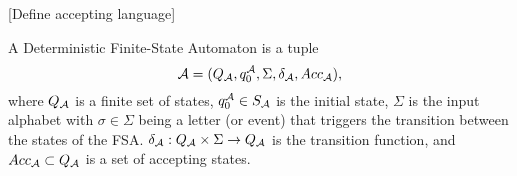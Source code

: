 \documentclass{ifacconf}
\newcommand{\red}[1]{{\color{red} #1}}
\begin{document}
% 

\red{[Define accepting language]}
\begin{definition}
A Deterministic Finite-State Automaton is a tuple
 \[\mathcal{A} = (Q_{\mathcal{A}}, q_0^{\mathcal{A}}, \Sigma, \delta_{\mathcal{A}}, Acc_{\mathcal{A}}),\] where %
$Q_{\mathcal{A}}$ is a finite set of states, $q_0^{\mathcal{A}} \in S_{\mathcal{A}}$ is the initial state,
$\Sigma$ is the input alphabet with $\sigma\in\Sigma$ being a letter (or event) that triggers the transition between the states of the FSA.   
$\delta_{\mathcal{A}} : Q_{\mathcal{A}} \times \Sigma \rightarrow Q_{\mathcal{A}}$ is the transition function, and
$Acc_{\mathcal{A}}\subset Q_{\mathcal{A}}$ is a set of accepting states.
\end{definition}
\end{document}
